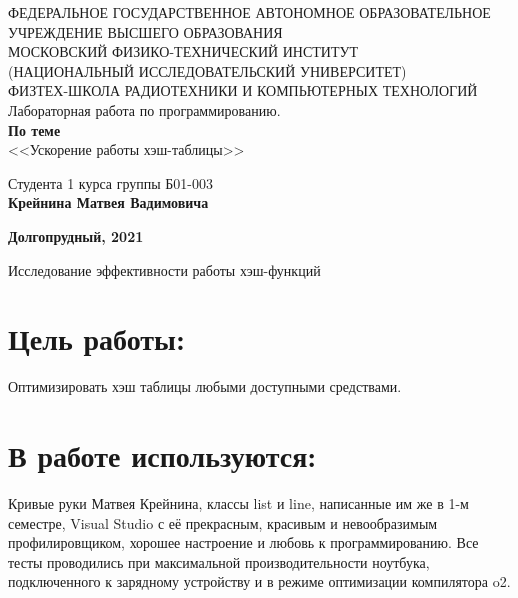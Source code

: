 \documentclass[a4paper,12pt]{article}
\begin{document}
\begin{center}
	\hfill \break
	\hfill \break
	{\small ФЕДЕРАЛЬНОЕ ГОСУДАРСТВЕННОЕ АВТОНОМНОЕ ОБРАЗОВАТЕЛЬНОЕ\\ УЧРЕЖДЕНИЕ ВЫСШЕГО ОБРАЗОВАНИЯ\\ МОСКОВСКИЙ ФИЗИКО-ТЕХНИЧЕСКИЙ ИНСТИТУТ\\ (НАЦИОНАЛЬНЫЙ ИССЛЕДОВАТЕЛЬСКИЙ УНИВЕРСИТЕТ)\\ ФИЗТЕХ-ШКОЛА РАДИОТЕХНИКИ И КОМПЬЮТЕРНЫХ ТЕХНОЛОГИЙ}\\

	\hfill \break
	\normalsize{Лабораторная работа по программированию. }\\
	\vspace{7em}
	\normalsize{\textbf{По теме}}\\
	\vspace{7em}
	\large{<<Ускорение работы хэш-таблицы>>}\\
\end{center}

\vspace{16em}
\begin{flushright}
	\normalsize{Студента 1 курса группы Б01-003}\\
	\normalsize{\textbf{Крейнина Матвея Вадимовича}}\\
\end{flushright}

\vspace{\fill}
\begin{center}
	\normalsize{\textbf{Долгопрудный, 2021}}
\end{center}


\thispagestyle{empty} %
\newpage

	
	\begin{center}
		{\Large Исследование эффективности работы хэш-функций}
	\end{center}
	\section*{Цель работы:}
Оптимизировать хэш таблицы любыми доступными средствами. 

\section*{В работе используются:}
Кривые руки Матвея Крейнина, классы list и line, написанные им же в 1-м семестре, Visual Studio с её прекрасным, красивым и невообразимым профилировщиком, хорошее настроение и любовь к программированию. Все тесты проводились при максимальной производительности ноутбука, подключенного к зарядному устройству и в режиме оптимизации компилятора o2.
\end{document}
